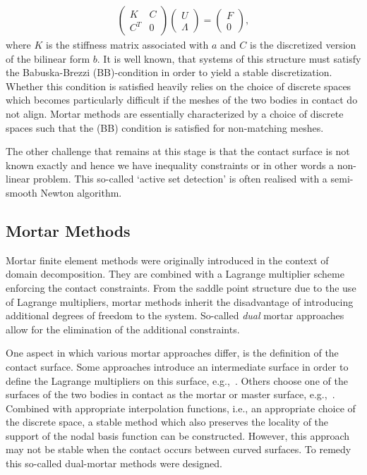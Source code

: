 \documentclass[12pt]{article}
\begin{document}
\begin{align*}
  \begin{pmatrix}
    K &C\\
    C^T & 0
  \end{pmatrix}
  \begin{pmatrix}
    U\\
    \Lambda
  \end{pmatrix} =
  \begin{pmatrix}
    F\\
    0
  \end{pmatrix},
\end{align*}
where $K$ is the stiffness matrix associated with $a$ and $C$ is the discretized version of the bilinear form $b$.
It is well known, that systems of this structure must satisfy the Babuska-Brezzi (BB)-condition in order to yield a stable discretization.
Whether this condition is satisfied heavily relies on the choice of discrete spaces which becomes particularly difficult if the meshes of the two bodies in contact do not align.
Mortar methods are essentially characterized by a  choice of discrete spaces such that the (BB) condition is satisfied for non-matching meshes.

The other challenge that remains at this stage is that the contact surface is not known exactly and hence we have inequality constraints or in other words a non-linear problem.
This so-called `active set detection' is often  realised with a semi-smooth Newton algorithm.
\subsection{Mortar Methods}
Mortar finite element methods were originally introduced in the context of domain decomposition.
They are combined with a  Lagrange multiplier scheme
enforcing the contact constraints. From the saddle point structure due to the use of Lagrange multipliers, mortar methods inherit the disadvantage of introducing additional degrees of freedom to the system.
So-called \emph{dual} mortar approaches allow for the elimination of the additional constraints.

One aspect in which various mortar approaches differ, is the definition of the contact surface.
Some approaches introduce an intermediate surface in order to define the Lagrange multipliers on this surface, e.g.,~\cite{mcdevitt2000mortar}.
Others choose one of the surfaces of the two bodies in contact as the mortar or master surface, e.g.,~\cite{wohlmuth2000mortar,krause2002dirichlet}.
Combined with appropriate interpolation functions, i.e., an appropriate choice of the discrete space, a stable method which also preserves the locality of the support of the nodal basis function can be constructed.
However, this approach may not be stable when the contact occurs between curved surfaces. To remedy this so-called dual-mortar methods were designed.
\end{document}
